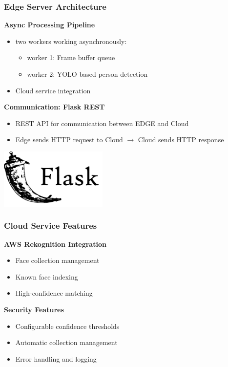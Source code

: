 \documentclass{beamer}
\begin{document}
\begin{frame}
    \frametitle{Edge Server Architecture}
    \textbf{Async Processing Pipeline}
    \begin{itemize}

    \item two workers working asynchronously: 
    \begin{itemize}
        \item worker 1: Frame buffer queue
        \item worker 2: YOLO-based person detection
    \end{itemize}

    \item Cloud service integration
\end{itemize}

\textbf{Communication: Flask REST}
\begin{itemize}
    \item REST API for communication between EDGE and Cloud
    \item Edge sends HTTP request to Cloud $\rightarrow$ Cloud sends HTTP response
\end{itemize}
\begin{center}

    \includegraphics[width=0.4\textwidth]{./res/flask.png}
\end{center}

    \end{frame}

\begin{frame}
\frametitle{Cloud Service Features}

    \textbf{AWS Rekognition Integration}
    \begin{itemize}
    \item Face collection management 
    \item Known face indexing
    \item High-confidence matching
    \end{itemize}
    \textbf{Security Features}
    \begin{itemize}
    \item Configurable confidence thresholds
    \item Automatic collection management
    \item Error handling and logging
    \end{itemize}

\end{frame}
\end{document}
